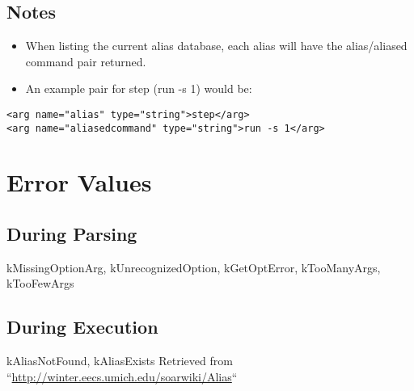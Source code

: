 \documentclass[10pt]{article}
\begin{document}
\subsection*{ Notes }
\begin{itemize}
\item  When listing the current alias database, each alias will have the alias/aliased command pair returned. 
\item  An example pair for step (run -s 1) would be: 

\end{itemize}
\begin{verbatim}
<arg name="alias" type="string">step</arg>
<arg name="aliasedcommand" type="string">run -s 1</arg>

\end{verbatim}
\section*{ Error Values }
\subsection*{ During Parsing }


 kMissingOptionArg, kUnrecognizedOption, kGetOptError, kTooManyArgs, kTooFewArgs
\subsection*{ During Execution }


 kAliasNotFound, kAliasExists Retrieved from ``\url{http://winter.eecs.umich.edu/soarwiki/Alias}``
\end{document}
